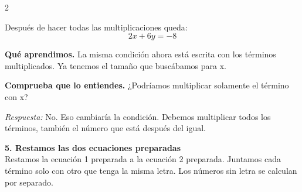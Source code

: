 \documentclass[11pt,a4paper,landscape]{article}
\begin{document}
\begin{multicols*}{2}
\begin{minipage}{\linewidth}
\par{}\par\smallskip
\par\smallskip Después de hacer todas las multiplicaciones queda:
\[2x + 6y = -8\]
\par\smallskip\textbf{Qué aprendimos.} La misma condición ahora está escrita con los términos multiplicados. Ya tenemos el tamaño que buscábamos para x.
\par\smallskip\textbf{Comprueba que lo entiendes.} ¿Podríamos multiplicar solamente el término con x?\par\textit{Respuesta:} No. Eso cambiaría la condición. Debemos multiplicar todos los términos, también el número que está después del igual.
\end{minipage}\par\medskip
\noindent\begin{minipage}{\linewidth}\textbf{5. Restamos las dos ecuaciones preparadas}\\[2pt]Restamos la ecuación 1 preparada a la ecuación 2 preparada. Juntamos cada término solo con otro que tenga la misma letra. Los números sin letra se calculan por separado.
\par{}\par\smallskip

\end{minipage}
\end{multicols*}
\end{document}
